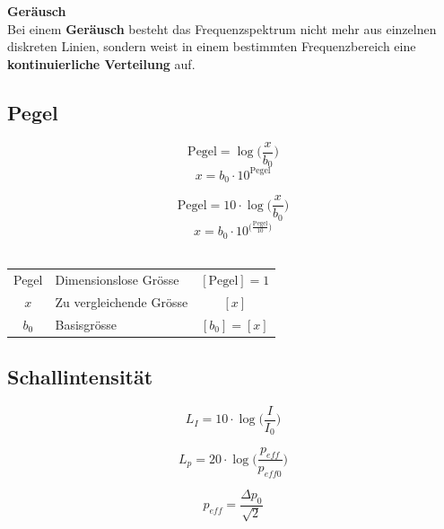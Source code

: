 \textbf{Geräusch} \\
Bei einem \textbf{Geräusch} besteht das Frequenzspektrum nicht mehr
aus einzelnen diskreten Linien, sondern weist in einem
bestimmten Frequenzbereich eine  \textbf{kontinuierliche Verteilung} auf. \\




\subsection{Pegel}\label{Pegel}

\begin{minipage}{0.48\linewidth}
$$ \boxed{ \text{Pegel} = \log \Big( \frac{x}{b_0} \Big) } $$
$$ \boxed{ x = b_0 \cdot 10^{\text{Pegel} } } $$ 

\end{minipage}
\hfill
\begin{minipage}{0.48\linewidth}
$$ \boxed{ \text{Pegel} = 10 \cdot \log \Big( \frac{x}{b_0} \Big) } $$ 
$$ \boxed{ x = b_0 \cdot 10^{\Big( \frac{\text{Pegel}}{10} \Big) } } $$ \\
\end{minipage}

\renewcommand{\arraystretch}{1.3}
\begin{tabular}{clc}
Pegel & Dimensionslose Grösse & $[\text{Pegel}] =  1$ \\
$x$ & Zu vergleichende Grösse & $[x]$ \\
$b_0$ & Basisgrösse & $[b_0] = [x]$ \\
\end{tabular}
\renewcommand{\arraystretch}{1}

\raggedright



\subsection{Schallintensität}

\begin{minipage}{0.48\linewidth}
$$ \boxed{ L_I = 10 \cdot \log \Big( \frac{I}{I_0} \Big) } $$ 
\end{minipage}
\hfill
\begin{minipage}{0.48\linewidth}
$$ \boxed{ L_p = 20 \cdot \log \Big( \frac{p_{eff}}{p_{eff0}} \Big) } $$ 
\end{minipage}

$$ \boxed{ p_{eff} = \frac{\Delta p_0}{\sqrt{2}} } $$ \\


